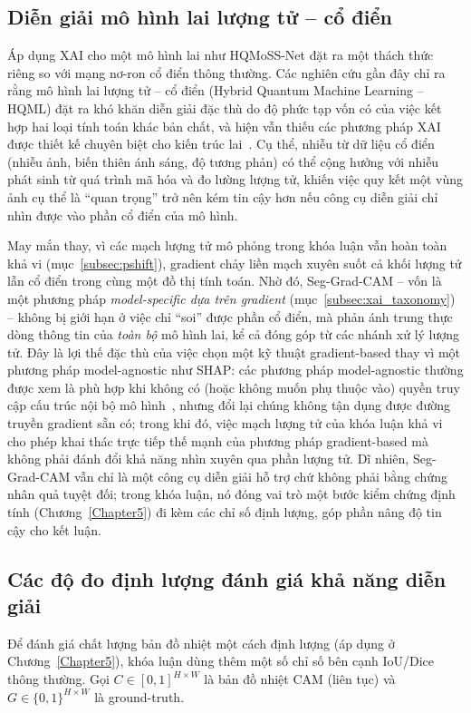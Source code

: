 \subsection{Diễn giải mô hình lai lượng tử -- cổ điển}
\label{subsec:xai_hybrid}
Áp dụng XAI cho một mô hình lai như HQMoSS-Net đặt ra một thách thức riêng so với mạng nơ-ron cổ điển thông thường. Các nghiên cứu gần đây chỉ ra rằng mô hình lai lượng tử -- cổ điển (Hybrid Quantum Machine Learning -- HQML) đặt ra khó khăn diễn giải đặc thù do độ phức tạp vốn có của việc kết hợp hai loại tính toán khác bản chất, và hiện vẫn thiếu các phương pháp XAI được thiết kế chuyên biệt cho kiến trúc lai~\cite{barua2025quxai}. Cụ thể, nhiễu từ dữ liệu cổ điển (nhiễu ảnh, biến thiên ánh sáng, độ tương phản) có thể cộng hưởng với nhiễu phát sinh từ quá trình mã hóa và đo lường lượng tử, khiến việc quy kết một vùng ảnh cụ thể là ``quan trọng'' trở nên kém tin cậy hơn nếu công cụ diễn giải chỉ nhìn được vào phần cổ điển của mô hình.

May mắn thay, vì các mạch lượng tử mô phỏng trong khóa luận vẫn hoàn toàn khả vi (mục~\ref{subsec:pshift}), gradient chảy liền mạch xuyên suốt cả khối lượng tử lẫn cổ điển trong cùng một đồ thị tính toán. Nhờ đó, Seg-Grad-CAM -- vốn là một phương pháp \emph{model-specific dựa trên gradient} (mục~\ref{subsec:xai_taxonomy}) -- không bị giới hạn ở việc chỉ ``soi'' được phần cổ điển, mà phản ánh trung thực dòng thông tin của \emph{toàn bộ} mô hình lai, kể cả đóng góp từ các nhánh xử lý lượng tử. Đây là lợi thế đặc thù của việc chọn một kỹ thuật gradient-based thay vì một phương pháp model-agnostic như SHAP: các phương pháp model-agnostic thường được xem là phù hợp khi không có (hoặc không muốn phụ thuộc vào) quyền truy cập cấu trúc nội bộ mô hình~\cite{barua2025quxai}, nhưng đổi lại chúng không tận dụng được đường truyền gradient sẵn có; trong khi đó, việc mạch lượng tử của khóa luận khả vi cho phép khai thác trực tiếp thế mạnh của phương pháp gradient-based mà không phải đánh đổi khả năng nhìn xuyên qua phần lượng tử. Dĩ nhiên, Seg-Grad-CAM vẫn chỉ là một công cụ diễn giải hỗ trợ chứ không phải bằng chứng nhân quả tuyệt đối; trong khóa luận, nó đóng vai trò một bước kiểm chứng định tính (Chương~\ref{Chapter5}) đi kèm các chỉ số định lượng, góp phần nâng độ tin cậy cho kết luận.

\subsection{Các độ đo định lượng đánh giá khả năng diễn giải}
\label{subsec:xai_metrics_formula}
Để đánh giá chất lượng bản đồ nhiệt một cách định lượng (áp dụng ở Chương~\ref{Chapter5}), khóa luận dùng thêm một số chỉ số bên cạnh IoU/Dice thông thường. Gọi $C \in [0,1]^{H\times W}$ là bản đồ nhiệt CAM (liên tục) và $G \in \{0,1\}^{H\times W}$ là ground-truth.


